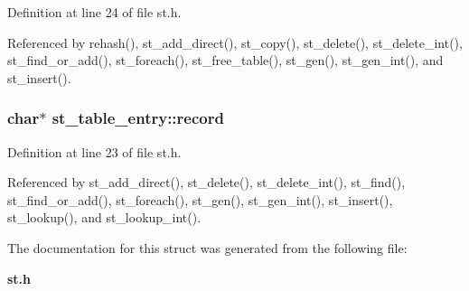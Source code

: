 Definition at line 24 of file st.h.

Referenced by rehash(), st\_\-add\_\-direct(), st\_\-copy(), st\_\-delete(), st\_\-delete\_\-int(), st\_\-find\_\-or\_\-add(), st\_\-foreach(), st\_\-free\_\-table(), st\_\-gen(), st\_\-gen\_\-int(), and st\_\-insert().
\subsubsection{\setlength{\rightskip}{0pt plus 5cm}char$\ast$ \bf{st\_\-table\_\-entry::record}}\label{structst__table__entry_bebe2de41d7c13a541ffb1220ca69943}




Definition at line 23 of file st.h.

Referenced by st\_\-add\_\-direct(), st\_\-delete(), st\_\-delete\_\-int(), st\_\-find(), st\_\-find\_\-or\_\-add(), st\_\-foreach(), st\_\-gen(), st\_\-gen\_\-int(), st\_\-insert(), st\_\-lookup(), and st\_\-lookup\_\-int().

The documentation for this struct was generated from the following file:\begin{CompactItemize}
\item 
\bf{st.h}\end{CompactItemize}
